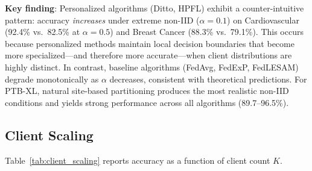 \documentclass[conference,a4paper]{IEEEtran}
\begin{document}
\textbf{Key finding}: Personalized algorithms (Ditto, HPFL) exhibit a counter-intuitive pattern: accuracy \textit{increases} under extreme non-IID ($\alpha{=}0.1$) on Cardiovascular (92.4\% vs.\ 82.5\% at $\alpha{=}0.5$) and Breast Cancer (88.3\% vs.\ 79.1\%). This occurs because personalized methods maintain local decision boundaries that become more specialized---and therefore more accurate---when client distributions are highly distinct. In contrast, baseline algorithms (FedAvg, FedExP, FedLESAM) degrade monotonically as $\alpha$ decreases, consistent with theoretical predictions. For PTB-XL, natural site-based partitioning produces the most realistic non-IID conditions and yields strong performance across all algorithms (89.7--96.5\%).

\subsection{Client Scaling}

Table~\ref{tab:client_scaling} reports accuracy as a function of client count $K$.
\end{document}
